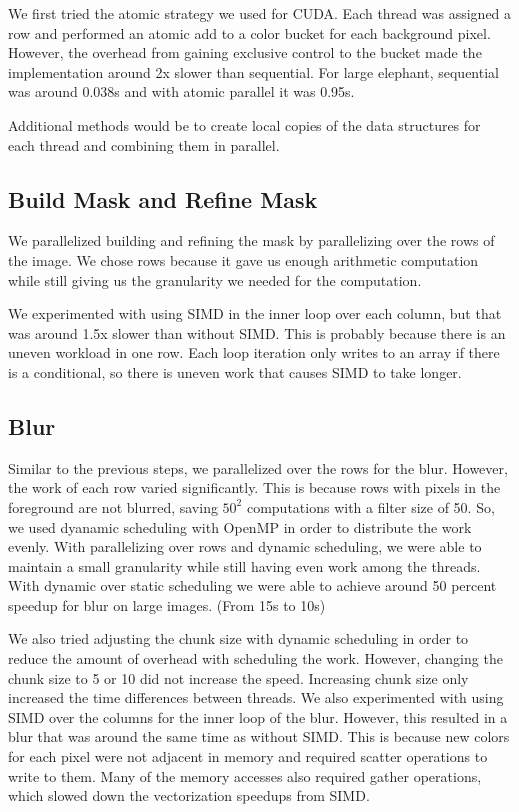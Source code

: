 \documentclass[12pt]{article}
\begin{document}
We first tried the atomic strategy we used for CUDA. Each thread was assigned
a row and performed an atomic add to a color bucket for each background pixel.
However, the overhead from gaining exclusive control to the bucket made the
implementation around 2x slower than sequential. For large elephant, sequential
was around 0.038s and with atomic parallel it was 0.95s.

Additional methods would be to create local copies of the data structures for
each thread and combining them in parallel.

\subsection{Build Mask and Refine Mask}
We parallelized building and refining the mask by parallelizing over the rows
of the image. We chose rows because it gave us enough arithmetic computation
while still giving us the granularity we needed for the computation.

We experimented with using SIMD in the inner loop over each column, but that was
around 1.5x slower than without SIMD. This is probably because there is an
uneven workload in one row. Each loop iteration only writes to an array if there
is a conditional, so there is uneven work that causes SIMD to take longer.

\subsection{Blur}
Similar to the previous steps, we parallelized over the rows for the blur.
However, the work of each row varied significantly. This is because rows
with pixels in the foreground are not blurred, saving $50^2$ computations
with a filter size of 50. So, we used dyanamic scheduling with OpenMP in order
to distribute the work evenly. With parallelizing over rows and dynamic
scheduling, we were able to maintain a small granularity while still having
even work among the threads. With dynamic over static scheduling we were able
to achieve around 50 percent speedup for blur on large images. (From 15s to 10s)

We also tried adjusting the chunk size with dynamic scheduling in order to
reduce the amount of overhead with scheduling the work. However, changing
the chunk size to 5 or 10 did not increase the speed. Increasing chunk size
only increased the time differences between threads. We also experimented with
using SIMD over the columns for the inner loop of the blur. However, this
resulted in a blur that was around the same time as without SIMD. This is
because new colors for each pixel were not adjacent in memory and required
scatter operations to write to them. Many of the memory accesses also required
gather operations, which slowed down the vectorization speedups from SIMD.
\end{document}
